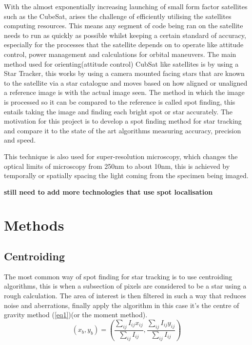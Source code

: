 \documentclass[aps,pra,a4paper,nofootinbib,onecolumn,tightenlines,longbibliography,12pt,amsfonts,amssymb,amsmath,floatfix]{revtex4-2} %
\begin{document}
  With the almost exponentially increasing launching of small form factor
  satellites such as the CubeSat, arises the challenge of efficiently utilising
  the satellites computing resources. This means any segment of code being ran on
  the satellite needs to run as quickly as possible whilst keeping a certain
  standard of accuracy, especially for the processes that the satellite depends
  on to operate like attitude control, power management and calculations for
  orbital maneuvers. The main method used for orienting(attitude control) CubSat
  like satellites is by using a Star Tracker, this works by using a camera mounted
  facing stars that are known to the satellite via a star catalogue and moves
  based on how aligned or unaligned a reference image is with the actual image
  seen.\cite{calitz2015design} The method in which the image is processed so it
  can be compared to the reference is called spot finding, this entails taking
  the image and finding each bright spot or star accurately. The motivation for
  this project is to develop a spot finding method for star tracking and compare
  it to the state of the art algorithms measuring accuracy, precision and speed.

  This technique is also used for super-resolution microscopy, which changes the
  optical limits of microscopy from 250nm to about 10nm, this is achieved by
  temporally or spatially spacing the light coming from the specimen being
  imaged. 

  \textbf{still need to add more technologies that use spot localisation}

\section{Methods} %
\label{sec:Methods}

  \subsection{Centroiding} %
  \label{sub:Centroiding_meth}
  
  
  
  The most common way of spot finding for star tracking is to use centroiding
  algorithms, this is when a subsection of pixels are considered to be a star
  using a rough calculation. The area of interest is then filtered in such a way
  that reduces noise and aberrations, finally apply the algorithm in this case
  it's the centre of gravity method (\ref{eq1})(or the moment
  method)\cite{delabie2014accurate}\cite{stone1989comparison}.
  \begin{equation}\label{eq1}
      (x_b,y_b) = \left( {\frac{\sum_{ij} I_{ij}x_{ij}}{\sum_{ij} I_{ij}},\frac{\sum_{ij} I_{ij}y_{ij}}{\sum_{ij} I_{ij}}}\right)
  \end{equation}
  
\end{document}
